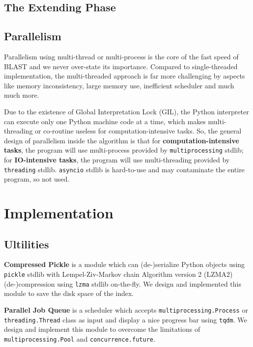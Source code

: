\documentclass[10pt,final,journal,twocolumn,a4paper]{IEEEtran}
\begin{document}
\subsection{The \textbf{Extending} Phase}

\subsection{Parallelism}

Parallelism using multi-thread or multi-process is the core of the fast speed of BLAST and we never over-state its importance. Compared to single-threaded implementation, the multi-threaded approach is far more challenging by aspects like memory inconsistency, large memory use, inefficient scheduler and much much more.

Due to the existence of Global Interpretation Lock (GIL), the Python interpreter can execute only one Python machine code at a time, which makes multi-threading or co-routine useless for computation-intensive tasks. So, the general design of parallelism inside the algorithm is that for \textbf{computation-intensive tasks}, the program will use multi-process provided by \verb|multiprocessing| stdlib; for \textbf{IO-intensive tasks}, the program will use multi-threading provided by \verb|threading| stdlib. \verb|asyncio| stdlib is hard-to-use and may contaminate the entire program, so not used.



\section{Implementation}

\subsection{Ultilities}

\textbf{Compressed Pickle} is a module which can (de-)serialize Python objects using \verb|pickle| stdlib with Lempel-Ziv-Markov chain Algorithm version 2 (LZMA2) (de-)compression using \verb|lzma| stdlib on-the-fly. We design and implemented this module to save the disk space of the index.

\textbf{Parallel Job Queue} is a scheduler which accepts \verb|multiprocessing.Process| or \verb|threading.Thread| class as input and display a nice progress bar using \verb|tqdm|. We design and implement this module to overcome the limitations of \verb|multiprocessing.Pool| and \verb|concurrence.future|.
\end{document}
